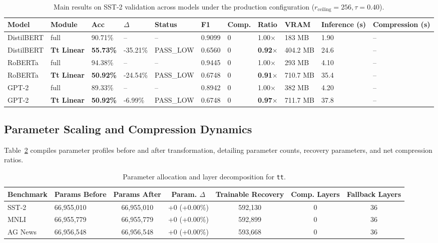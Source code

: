 \begin{table}[t]
\centering
\small
\begin{tabular}{lllllllllll}
\toprule
\textbf{Model} & \textbf{Module} & \textbf{Acc} & \textbf{$\Delta$} & \textbf{Status} & \textbf{F1} & \textbf{Comp.} & \textbf{Ratio} & \textbf{VRAM} & \textbf{Inference (s)} & \textbf{Compression (s)} \\
\midrule
DistilBERT & full & 90.71\% & -- & -- & 0.9099 & 0 & 1.00$\times$ & 183 MB & 1.90 & -- \\
DistilBERT & \textbf{Tt Linear} & \textbf{55.73\%} & -35.21\% & PASS_LOW & 0.6560 & 0 & \textbf{0.92$\times$} & 404.2 MB & 24.6 & -- \\
RoBERTa & full & 94.38\% & -- & -- & 0.9445 & 0 & 1.00$\times$ & 293 MB & 4.10 & -- \\
RoBERTa & \textbf{Tt Linear} & \textbf{50.92\%} & -24.54\% & PASS_LOW & 0.6748 & 0 & \textbf{0.91$\times$} & 710.7 MB & 35.4 & -- \\
GPT-2 & full & 89.33\% & -- & -- & 0.8942 & 0 & 1.00$\times$ & 382 MB & 4.20 & -- \\
GPT-2 & \textbf{Tt Linear} & \textbf{50.92\%} & -6.99\% & PASS_LOW & 0.6748 & 0 & \textbf{0.97$\times$} & 711.7 MB & 37.8 & -- \\
\bottomrule
\end{tabular}
\caption{Main results on SST-2 validation across models under the production configuration ($r_{\mathrm{ceiling}}=256, \tau=0.40$).}
\label{tab:main_sst2}
\end{table}

\subsection{Parameter Scaling and Compression Dynamics}
Table~\ref{tab:params_tt} compiles parameter profiles before and after transformation, detailing parameter counts, recovery parameters, and net compression ratios.

\begin{table}[t]
\centering
\small
\begin{tabular}{llccccc}
\toprule
\textbf{Benchmark} & \textbf{Params Before} & \textbf{Params After} & \textbf{Param. $\Delta$} & \textbf{Trainable Recovery} & \textbf{Comp. Layers} & \textbf{Fallback Layers} \\
\midrule
SST-2 & 66,955,010 & 66,955,010 & +0 (+0.00\%) & 592,130 & 0 & 36 \\
MNLI & 66,955,779 & 66,955,779 & +0 (+0.00\%) & 592,899 & 0 & 36 \\
AG News & 66,956,548 & 66,956,548 & +0 (+0.00\%) & 593,668 & 0 & 36 \\
\bottomrule
\end{tabular}
\caption{Parameter allocation and layer decomposition for \texttt{tt}.}
\label{tab:params_tt}
\end{table}

